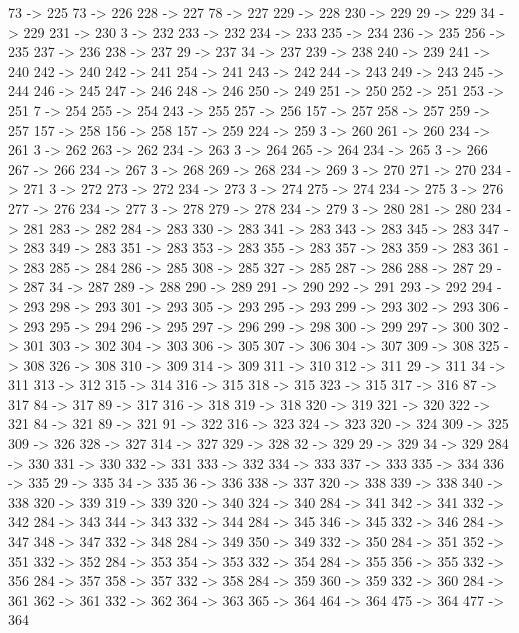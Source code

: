 {	73 -> 225
	73 -> 226
	228 -> 227
	78 -> 227
	229 -> 228
	230 -> 229
	29 -> 229
	34 -> 229
	231 -> 230
	3 -> 232
	233 -> 232
	234 -> 233
	235 -> 234
	236 -> 235
	256 -> 235
	237 -> 236
	238 -> 237
	29 -> 237
	34 -> 237
	239 -> 238
	240 -> 239
	241 -> 240
	242 -> 240
	242 -> 241
	254 -> 241
	243 -> 242
	244 -> 243
	249 -> 243
	245 -> 244
	246 -> 245
	247 -> 246
	248 -> 246
	250 -> 249
	251 -> 250
	252 -> 251
	253 -> 251
	7 -> 254
	255 -> 254
	243 -> 255
	257 -> 256
	157 -> 257
	258 -> 257
	259 -> 257
	157 -> 258
	156 -> 258
	157 -> 259
	224 -> 259
	3 -> 260
	261 -> 260
	234 -> 261
	3 -> 262
	263 -> 262
	234 -> 263
	3 -> 264
	265 -> 264
	234 -> 265
	3 -> 266
	267 -> 266
	234 -> 267
	3 -> 268
	269 -> 268
	234 -> 269
	3 -> 270
	271 -> 270
	234 -> 271
	3 -> 272
	273 -> 272
	234 -> 273
	3 -> 274
	275 -> 274
	234 -> 275
	3 -> 276
	277 -> 276
	234 -> 277
	3 -> 278
	279 -> 278
	234 -> 279
	3 -> 280
	281 -> 280
	234 -> 281
	283 -> 282
	284 -> 283
	330 -> 283
	341 -> 283
	343 -> 283
	345 -> 283
	347 -> 283
	349 -> 283
	351 -> 283
	353 -> 283
	355 -> 283
	357 -> 283
	359 -> 283
	361 -> 283
	285 -> 284
	286 -> 285
	308 -> 285
	327 -> 285
	287 -> 286
	288 -> 287
	29 -> 287
	34 -> 287
	289 -> 288
	290 -> 289
	291 -> 290
	292 -> 291
	293 -> 292
	294 -> 293
	298 -> 293
	301 -> 293
	305 -> 293
	295 -> 293
	299 -> 293
	302 -> 293
	306 -> 293
	295 -> 294
	296 -> 295
	297 -> 296
	299 -> 298
	300 -> 299
	297 -> 300
	302 -> 301
	303 -> 302
	304 -> 303
	306 -> 305
	307 -> 306
	304 -> 307
	309 -> 308
	325 -> 308
	326 -> 308
	310 -> 309
	314 -> 309
	311 -> 310
	312 -> 311
	29 -> 311
	34 -> 311
	313 -> 312
	315 -> 314
	316 -> 315
	318 -> 315
	323 -> 315
	317 -> 316
	87 -> 317
	84 -> 317
	89 -> 317
	316 -> 318
	319 -> 318
	320 -> 319
	321 -> 320
	322 -> 321
	84 -> 321
	89 -> 321
	91 -> 322
	316 -> 323
	324 -> 323
	320 -> 324
	309 -> 325
	309 -> 326
	328 -> 327
	314 -> 327
	329 -> 328
	32 -> 329
	29 -> 329
	34 -> 329
	284 -> 330
	331 -> 330
	332 -> 331
	333 -> 332
	334 -> 333
	337 -> 333
	335 -> 334
	336 -> 335
	29 -> 335
	34 -> 335
	36 -> 336
	338 -> 337
	320 -> 338
	339 -> 338
	340 -> 338
	320 -> 339
	319 -> 339
	320 -> 340
	324 -> 340
	284 -> 341
	342 -> 341
	332 -> 342
	284 -> 343
	344 -> 343
	332 -> 344
	284 -> 345
	346 -> 345
	332 -> 346
	284 -> 347
	348 -> 347
	332 -> 348
	284 -> 349
	350 -> 349
	332 -> 350
	284 -> 351
	352 -> 351
	332 -> 352
	284 -> 353
	354 -> 353
	332 -> 354
	284 -> 355
	356 -> 355
	332 -> 356
	284 -> 357
	358 -> 357
	332 -> 358
	284 -> 359
	360 -> 359
	332 -> 360
	284 -> 361
	362 -> 361
	332 -> 362
	364 -> 363
	365 -> 364
	464 -> 364
	475 -> 364
	477 -> 364
}
